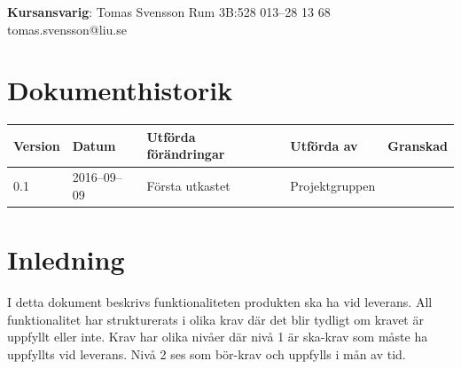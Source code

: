 \documentclass[a4paper,titlepage,12pt]{article}
\begin{document}
\begin{center}
		\centering
		\textbf{Kursansvarig}: Tomas Svensson Rum 3B:528 013--28 13 68 tomas.svensson@liu.se

		\newpage
		\tableofcontents
		\newpage



		\section*{Dokumenthistorik}
		\begin{table}[h]
			\begin{tabular}[pos]{ l l l l l }
				\textbf{Version} & \textbf{Datum} & \textbf{Utförda förändringar} 
				& \textbf{Utförda av} & \textbf{Granskad} \\ \midrule

				0.1 & 2016--09--09 & Första utkastet & Projektgruppen & \\

			\end{tabular}
		\end{table}
	\end{center}


	\newpage

	\section{Inledning}
	I detta dokument beskrivs funktionaliteten produkten ska ha vid leverans.
    All funktionalitet har strukturerats i olika krav där det blir tydligt om
    kravet är uppfyllt eller inte. Krav har olika nivåer där nivå 1 är ska-krav
    som måste ha uppfyllts vid leverans. Nivå 2 ses som bör-krav och uppfylls i
    mån av tid.


  \newpage
\end{document}
